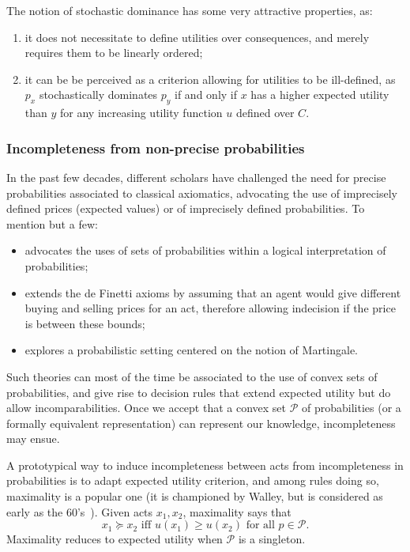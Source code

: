 \documentclass[version=last, pagesize, twocolumn, twoside=off, bibliography=totoc, 12pt, a4paper, english]{scrartcl}
\begin{document}
The notion of stochastic dominance has some very attractive properties, as:
\begin{enumerate}
	\item it does not necessitate to define utilities over consequences, and merely requires them to be linearly ordered;
	\item it can be be perceived as a criterion allowing for utilities to be ill-defined, as $p_x$ stochastically dominates $p_y$ if and only if $x$ has a higher expected utility than $y$ for any increasing utility function $u$ defined over $C$. 
\end{enumerate}

\subsubsection{Incompleteness from non-precise probabilities}

In the past few decades, different scholars have challenged the need for precise probabilities associated to classical axiomatics, advocating the use of imprecisely defined prices (expected values) or of imprecisely defined probabilities. To mention but a few:
\begin{itemize} 
	\item \citet{levi_enterprise_1983} advocates the uses of sets of probabilities within a logical interpretation of probabilities;
	\item \citet{walley_statistical_1991} extends the de Finetti axioms by assuming that an agent would give different buying and selling prices for an act, therefore allowing indecision if the price is between these bounds;
	\item \citet{shafer_probability_2005} explores a probabilistic setting centered on the notion of Martingale.
\end{itemize}
Such theories can most of the time be associated to the use of convex sets of probabilities, and give rise to decision rules that extend expected utility but do allow incomparabilities. Once we accept that a convex set $\mathcal{P}$ of probabilities (or a formally equivalent representation) can represent our knowledge, incompleteness may ensue. 

A prototypical way to induce incompleteness between acts from incompleteness in probabilities is to adapt expected utility criterion, and among rules doing so, maximality is a popular one (it is championed by Walley, but is considered as early as the 60's~\citep{aumann_utility_1962}). Given acts $x_1, x_2$, maximality says that 
$$x_1 \succeq x_2 \text{ iff }  u(x_1) ≥ u(x_2) \text{ for all } p \in \mathcal{P}.$$
Maximality reduces to expected utility when $\mathcal{P}$ is a singleton. 
\end{document}
